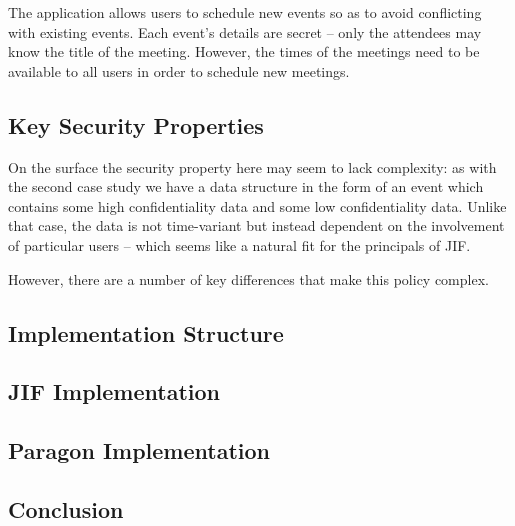 The application allows users to schedule new events so as to avoid conflicting with existing events. Each event's details are secret -- only the attendees may know the title of the meeting. However, the times of the meetings need to be available to all users in order to schedule new meetings.

\subsection{Key Security Properties}

On the surface the security property here may seem to lack complexity: as with the second case study we have a data structure in the form of an event which contains some high confidentiality data and some low confidentiality data. Unlike that case, the data is not time-variant but instead dependent on the involvement of particular users -- which seems like a natural fit for the principals of JIF.

However, there are a number of key differences that make this policy complex.

\subsection{Implementation Structure}

\subsection{JIF Implementation}

\subsection{Paragon Implementation}

\subsection{Conclusion}